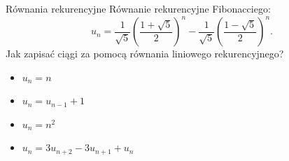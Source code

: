 \documentclass[handout]{beamer}
\theoremstyle{definition}
\theoremstyle{named}
\begin{document}
\begin{frame}{Równania rekurencyjne}
Równanie rekurencyjne Fibonacciego: 
$$
{\displaystyle u_{n}={\frac {1}{\sqrt {5}}}\left({\frac {1+{\sqrt {5}}}{2}}\right)^{n}-{\frac {1}{\sqrt {5}}}\left({\frac {1-{\sqrt {5}}}{2}}\right)^{n}.}
$$
 Jak zapisać ciągi za pomocą równania liniowego rekurencyjnego? 
\begin{itemize}
    \item  $u_n = n$
    \pause 
    \item $u_n = u_{n-1} + 1$
    \pause
    \item  $u_n = n^{2}$
    \pause
    \item $u_n = 3 u_{n+2} - 3u_{n+1} + u_n$

\end{itemize}

\end{frame}
\end{document}
